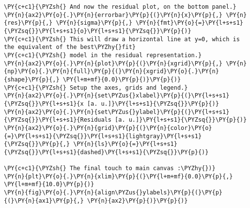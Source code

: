 \begin{Verbatim}[label=\makebox{\href{https://github.com/unipi-physics-labs/lab1-notes/tree/main/snippy/residual_plot.py}{https://github.com/.../residual\_plot.py}},commandchars=\\\{\}]
\PY{c+c1}{\PYZsh{} And now the residual plot, on the bottom panel.}
\PY{n}{ax2}\PY{o}{.}\PY{n}{errorbar}\PY{p}{(}\PY{n}{x}\PY{p}{,} \PY{n}{res}\PY{p}{,} \PY{n}{sigma}\PY{p}{,} \PY{n}{fmt}\PY{o}{=}\PY{l+s+s1}{\PYZsq{}}\PY{l+s+s1}{o}\PY{l+s+s1}{\PYZsq{}}\PY{p}{)}
\PY{c+c1}{\PYZsh{} This will draw a horizontal line at y=0, which is the equivalent of the best\PYZhy{}fit}
\PY{c+c1}{\PYZsh{} model in the residual representation.}
\PY{n}{ax2}\PY{o}{.}\PY{n}{plot}\PY{p}{(}\PY{n}{xgrid}\PY{p}{,} \PY{n}{np}\PY{o}{.}\PY{n}{full}\PY{p}{(}\PY{n}{xgrid}\PY{o}{.}\PY{n}{shape}\PY{p}{,} \PY{l+m+mf}{0.0}\PY{p}{)}\PY{p}{)}
\PY{c+c1}{\PYZsh{} Setup the axes, grids and legend.}
\PY{n}{ax2}\PY{o}{.}\PY{n}{set\PYZus{}xlabel}\PY{p}{(}\PY{l+s+s1}{\PYZsq{}}\PY{l+s+s1}{x [a. u.]}\PY{l+s+s1}{\PYZsq{}}\PY{p}{)}
\PY{n}{ax2}\PY{o}{.}\PY{n}{set\PYZus{}ylabel}\PY{p}{(}\PY{l+s+s1}{\PYZsq{}}\PY{l+s+s1}{Residuals [a. u.]}\PY{l+s+s1}{\PYZsq{}}\PY{p}{)}
\PY{n}{ax2}\PY{o}{.}\PY{n}{grid}\PY{p}{(}\PY{n}{color}\PY{o}{=}\PY{l+s+s1}{\PYZsq{}}\PY{l+s+s1}{lightgray}\PY{l+s+s1}{\PYZsq{}}\PY{p}{,} \PY{n}{ls}\PY{o}{=}\PY{l+s+s1}{\PYZsq{}}\PY{l+s+s1}{dashed}\PY{l+s+s1}{\PYZsq{}}\PY{p}{)}

\PY{c+c1}{\PYZsh{} The final touch to main canvas :\PYZhy{})}
\PY{n}{plt}\PY{o}{.}\PY{n}{xlim}\PY{p}{(}\PY{l+m+mf}{0.0}\PY{p}{,} \PY{l+m+mf}{10.0}\PY{p}{)}
\PY{n}{fig}\PY{o}{.}\PY{n}{align\PYZus{}ylabels}\PY{p}{(}\PY{p}{(}\PY{n}{ax1}\PY{p}{,} \PY{n}{ax2}\PY{p}{)}\PY{p}{)}
\end{Verbatim}
